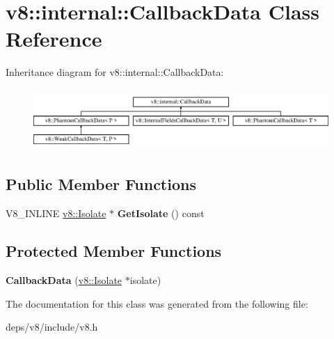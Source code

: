\hypertarget{classv8_1_1internal_1_1_callback_data}{}\section{v8\+:\+:internal\+:\+:Callback\+Data Class Reference}
\label{classv8_1_1internal_1_1_callback_data}
Inheritance diagram for v8\+:\+:internal\+:\+:Callback\+Data\+:\begin{figure}[H]
\begin{center}
\leavevmode
\includegraphics[height=2.343096cm]{classv8_1_1internal_1_1_callback_data}
\end{center}
\end{figure}
\subsection*{Public Member Functions}
\begin{DoxyCompactItemize}
\item 
\hypertarget{classv8_1_1internal_1_1_callback_data_ac94ddcb7e49c191922f03eb810f62692}{}V8\+\_\+\+I\+N\+L\+I\+N\+E \hyperlink{classv8_1_1_isolate}{v8\+::\+Isolate} $\ast$ {\bfseries Get\+Isolate} () const \label{classv8_1_1internal_1_1_callback_data_ac94ddcb7e49c191922f03eb810f62692}

\end{DoxyCompactItemize}
\subsection*{Protected Member Functions}
\begin{DoxyCompactItemize}
\item 
\hypertarget{classv8_1_1internal_1_1_callback_data_a3f5e99bfe131cfea0ce0030895bdf593}{}{\bfseries Callback\+Data} (\hyperlink{classv8_1_1_isolate}{v8\+::\+Isolate} $\ast$isolate)\label{classv8_1_1internal_1_1_callback_data_a3f5e99bfe131cfea0ce0030895bdf593}

\end{DoxyCompactItemize}


The documentation for this class was generated from the following file\+:\begin{DoxyCompactItemize}
\item 
deps/v8/include/v8.\+h\end{DoxyCompactItemize}
